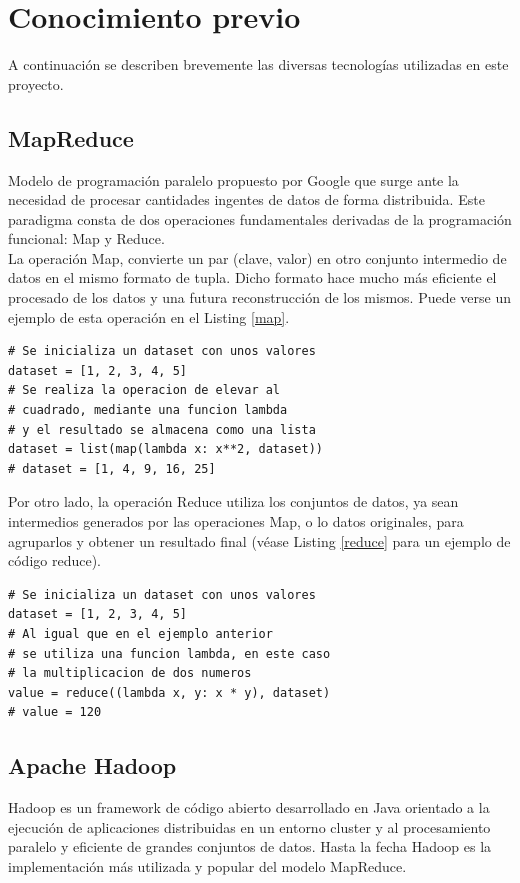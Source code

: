 \documentclass[conference]{IEEEtran}
\begin{document}
\section{Conocimiento previo}

A continuación se describen brevemente las diversas tecnologías utilizadas en este proyecto.

\subsection{MapReduce}
Modelo de programación paralelo propuesto por Google\cite{mapreduce} que surge ante la necesidad de procesar cantidades ingentes de datos de forma distribuida. Este paradigma consta de dos operaciones fundamentales derivadas de la programación funcional: Map y Reduce.\\

La operación Map, convierte un par (clave, valor) en otro conjunto intermedio de datos en el mismo formato de tupla. Dicho formato hace mucho más eficiente el procesado de los datos y una futura reconstrucción de los mismos. Puede verse un ejemplo de esta operación en el Listing \ref{map}.\\

\begin{lstlisting}[style=pythonStyle, caption=Ejemplo de operación Map, label=map]
# Se inicializa un dataset con unos valores
dataset = [1, 2, 3, 4, 5]
# Se realiza la operacion de elevar al 
# cuadrado, mediante una funcion lambda
# y el resultado se almacena como una lista
dataset = list(map(lambda x: x**2, dataset))
# dataset = [1, 4, 9, 16, 25]
\end{lstlisting}

Por otro lado, la operación Reduce utiliza los conjuntos de datos, ya sean intermedios generados por las operaciones Map, o lo datos originales, para agruparlos y obtener un resultado final (véase Listing \ref{reduce} para un ejemplo de código reduce).

\begin{lstlisting}[style=pythonStyle, caption=Ejemplo de operación Reduce, label=reduce]
# Se inicializa un dataset con unos valores
dataset = [1, 2, 3, 4, 5]
# Al igual que en el ejemplo anterior 
# se utiliza una funcion lambda, en este caso
# la multiplicacion de dos numeros
value = reduce((lambda x, y: x * y), dataset)
# value = 120
\end{lstlisting}

\subsection{Apache Hadoop}
Hadoop \cite{hadoop} es un framework de código abierto desarrollado en Java orientado a la ejecución de aplicaciones distribuidas en un entorno cluster y al procesamiento paralelo y eficiente de grandes conjuntos de datos. Hasta la fecha Hadoop es la implementación más utilizada y popular del modelo MapReduce.
\end{document}
